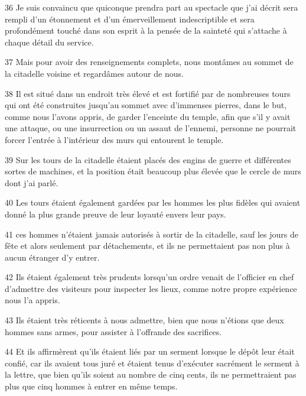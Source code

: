 \par 36 Je suis convaincu que quiconque prendra part au spectacle que j'ai décrit sera rempli d'un étonnement et d'un émerveillement indescriptible et sera profondément touché dans son esprit à la pensée de la sainteté qui s'attache à chaque détail du service.

\par 37 Mais pour avoir des renseignements complets, nous montâmes au sommet de la citadelle voisine et regardâmes autour de nous.

\par 38 Il est situé dans un endroit très élevé et est fortifié par de nombreuses tours qui ont été construites jusqu'au sommet avec d'immenses pierres, dans le but, comme nous l'avons appris, de garder l'enceinte du temple, afin que s'il y avait une attaque, ou une insurrection ou un assaut de l'ennemi, personne ne pourrait forcer l'entrée à l'intérieur des murs qui entourent le temple.

\par 39 Sur les tours de la citadelle étaient placés des engins de guerre et différentes sortes de machines, et la position était beaucoup plus élevée que le cercle de murs dont j'ai parlé.

\par 40 Les tours étaient également gardées par les hommes les plus fidèles qui avaient donné la plus grande preuve de leur loyauté envers leur pays.

\par 41 ces hommes n'étaient jamais autorisés à sortir de la citadelle, sauf les jours de fête et alors seulement par détachements, et ils ne permettaient pas non plus à aucun étranger d'y entrer.

\par 42 Ils étaient également très prudents lorsqu'un ordre venait de l'officier en chef d'admettre des visiteurs pour inspecter les lieux, comme notre propre expérience nous l'a appris.

\par 43 Ils étaient très réticents à nous admettre, bien que nous n'étions que deux hommes sans armes, pour assister à l'offrande des sacrifices.

\par 44 Et ils affirmèrent qu'ils étaient liés par un serment lorsque le dépôt leur était confié, car ils avaient tous juré et étaient tenus d'exécuter sacrément le serment à la lettre, que bien qu'ils soient au nombre de cinq cents, ils ne permettraient pas plus que cinq hommes à entrer en même temps.

